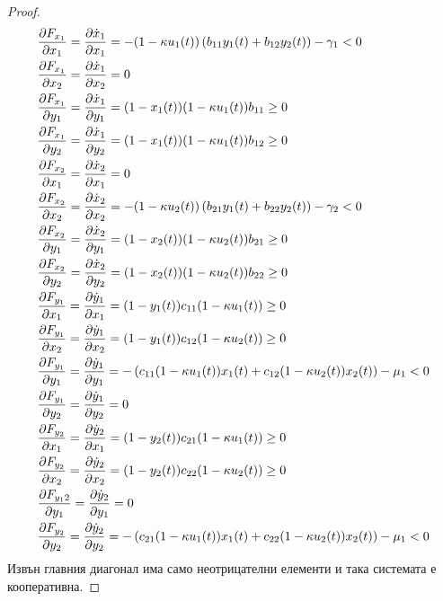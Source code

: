 \begin{proof}
  \label{eq:JacobianElements}
  \begin{equation}
    \begin{split}
      &\pdv{F_{x_1}}{x_1} = \pdv{\dot{x}_1}{x_1} = -(1-\kappa u_1(t)) \left(b_{11} y_1(t) + b_{12} y_2(t)\right) - \gamma_1 < 0 \\
      &\pdv{F_{x_1}}{x_2} = \pdv{\dot{x}_1}{x_2} = 0 \\
      &\pdv{F_{x_1}}{y_1} = \pdv{\dot{x}_1}{y_1} = (1-x_1(t)) (1-\kappa u_1(t)) b_{11} \geq 0 \\
      &\pdv{F_{x_1}}{y_2} = \pdv{\dot{x}_1}{y_2} = (1-x_1(t)) (1-\kappa u_1(t)) b_{12} \geq 0 \\
      &\pdv{F_{x_2}}{x_1} = \pdv{\dot{x}_2}{x_1} = 0 \\
      &\pdv{F_{x_2}}{x_2} = \pdv{\dot{x}_2}{x_2} = -(1-\kappa u_2(t)) \left(b_{21} y_1(t) + b_{22} y_2(t)\right) - \gamma_2 < 0 \\
      &\pdv{F_{x_2}}{y_1} = \pdv{\dot{x}_2}{y_1} = (1-x_2(t)) (1-\kappa u_2(t)) b_{21} \geq 0 \\
      &\pdv{F_{x_2}}{y_2} = \pdv{\dot{x}_2}{y_2} = (1-x_2(t)) (1-\kappa u_2(t)) b_{22} \geq 0 \\
      &\pdv{F_{y_1}}{x_1} = \pdv{\dot{y}_1}{x_1} = (1-y_1(t)) c_{11}(1-\kappa u_1(t)) \geq 0 \\
      &\pdv{F_{y_1}}{x_2} = \pdv{\dot{y}_1}{x_2} = (1-y_1(t)) c_{12}(1-\kappa u_2(t)) \geq 0 \\
      &\pdv{F_{y_1}}{y_1} = \pdv{\dot{y}_1}{y_1} = -\left(c_{11}(1-\kappa u_1(t)) x_1(t) + c_{12}(1-\kappa u_2(t)) x_2(t)\right) - \mu_1 < 0 \\
      &\pdv{F_{y_1}}{y_2} = \pdv{\dot{y}_1}{y_2} = 0 \\
      &\pdv{F_{y_2}}{x_1} = \pdv{\dot{y}_2}{x_1} = (1-y_2(t)) c_{21}(1-\kappa u_1(t)) \geq 0 \\
      &\pdv{F_{y_2}}{x_2} = \pdv{\dot{y}_2}{x_2} = (1-y_2(t)) c_{22}(1-\kappa u_2(t)) \geq 0 \\
      &\pdv{F_{y_12}}{y_1} = \pdv{\dot{y}_2}{y_1} = 0 \\
      &\pdv{F_{y_2}}{y_2} = \pdv{\dot{y}_2}{y_2} = -\left(c_{21}(1-\kappa u_1(t)) x_1(t) + c_{22}(1-\kappa u_2(t)) x_2(t)\right) - \mu_1 < 0
    \end{split}
    \end{equation}
  Извън главния диагонал има само неотрицателни елементи и така системата е кооперативна.
\end{proof}


